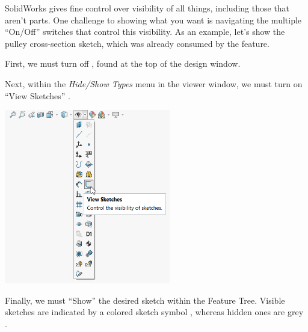 \begin{aside}
\label{box:all_types}

SolidWorks gives fine control over visibility of all things, including those that aren't
parts. One challenge to showing what you want is navigating the multiple ``On/Off'' switches that control
this visibility. As an example, let's show the pulley cross-section sketch,
which was already consumed by the  feature.

First, we must turn off , found at the top of the
design window.

Next, within the \emph{Hide/Show Types} menu in the viewer window, we must turn on
``View Sketches'' .

\begin{center}
\includegraphics[height=3in]{images/figures/hide-show-menu.png}
\end{center}

Finally, we must ``Show''  the
desired sketch within the Feature Tree. Visible sketches are indicated by a
colored sketch symbol , whereas hidden ones are grey
.

\end{aside}

